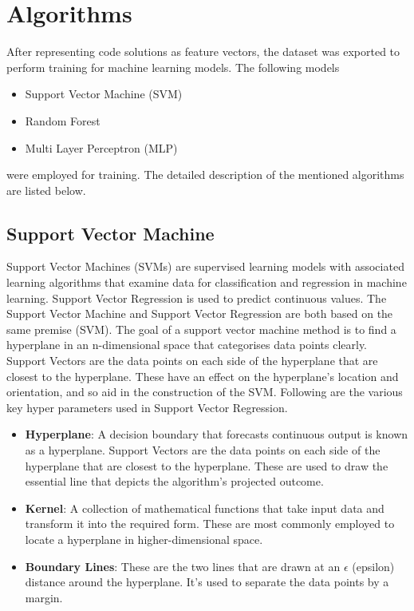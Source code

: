 \documentclass[conference]{IEEEtran}
\begin{document}
\section{Algorithms}

After representing code solutions as feature vectors, the dataset was exported to perform training for machine learning models. The following models 

\begin{itemize}
    \item Support Vector Machine (SVM)
    \item Random Forest 
    \item Multi Layer Perceptron (MLP)
\end{itemize}

were employed for training. The detailed description of the mentioned algorithms are listed below. 

\subsection{Support Vector Machine}

Support Vector Machines (SVMs) are supervised learning models with associated learning algorithms that examine data for classification and regression in machine learning. Support Vector Regression \cite{D} is used to predict continuous values. The Support Vector Machine and Support Vector Regression are both based on the same premise (SVM). The goal of a support vector machine method is to find a hyperplane in an n-dimensional space that categorises data points clearly. Support Vectors are the data points on each side of the hyperplane that are closest to the hyperplane. These have an effect on the hyperplane's location and orientation, and so aid in the construction of the SVM. Following are the various key hyper parameters used in Support Vector Regression.


\begin{itemize}
    \item \textbf{Hyperplane}: A decision boundary that forecasts continuous output is known as a hyperplane. Support Vectors are the data points on each side of the hyperplane that are closest to the hyperplane. These are used to draw the essential line that depicts the algorithm's projected outcome.
    \item \textbf{Kernel}: A collection of mathematical functions that take input data and transform it into the required form. These are most commonly employed to locate a hyperplane in higher-dimensional space.
    \item \textbf{Boundary Lines}: These are the two lines that are drawn at an \textbf{$\epsilon$} (epsilon) distance around the hyperplane. It's used to separate the data points by a margin.
\end{itemize}
\end{document}
